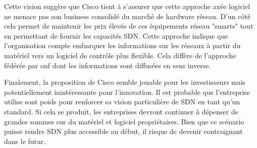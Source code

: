 Cette vision suggère que Cisco tient à s'assurer que cette approche axée logiciel ne menace pas son business consolidé du marché de hardware réseau. D'un côté cela permet de maintenir les prix élevés de ces équipements réseau "smarts" tout en permettant de fournir les capacités SDN. Cette approche indique que l'organisation compte embarquer les informations sur les réseaux à partir du matériel vers un logiciel de contrôle plus flexible. Cela diffère de l'approche fédérée par \gls{onf} dont les informations sont diffusées en sens inverse. 



Finalement, la proposition de Cisco semble jouable pour les investisseurs mais potentiellement inintéressante pour l'innovation. Il est probable que l'entreprise utilise sont poids pour renforcer sa vision particulière de SDN en tant qu'un standard. Si cela se produit, les entreprises devront continuer à dépenser de grandes sommes sur du matériel et logiciel propriétaires. Bien que ce scénario puisse rendre SDN plus accessible au début, il risque de devenir contraignant dans le futur. \cite{ExecutiveGuideToSDNCisco}




